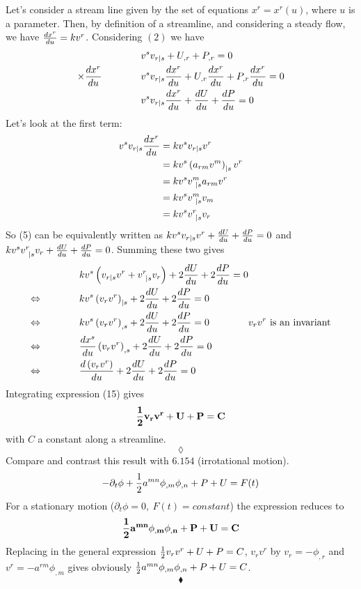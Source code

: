 Let's consider a stream line given by the set of equations $x^r = x^r(u)$, where $u$ is a parameter. Then, by definition of a streamline, and considering a steady flow, we have $\dv{x^r}{u} = kv^r$. Considering $(2)$ we have 
\begin{align}
&v^sv_{r|s} + U_{,r}+P_{,r}= 0\\
\times \dv{x^r}{u} \quad\quad\quad\quad &v^sv_{r|s}\dv{x^r}{u} + U_{,r}\dv{x^r}{u}+P_{,r}\dv{x^r}{u}= 0\\
\quad\quad\quad\quad &v^sv_{r|s}\dv{x^r}{u} + \dv{U}{u}+\dv{P}{u}= 0
\end{align}
Let's look at the first term:
\begin{align}
v^sv_{r|s}\dv{x^r}{u}&=kv^sv_{r|s}v^r\\
&=kv^s\left(a_{rm}v^m\right)_{|s}v^r\\
&=kv^sv^m_{\  |s}a_{rm}v^r\\
&=kv^sv^m_{\ |s}v_m\\
&=kv^sv^r_{\ |s}v_r
\end{align}
So (5) can be equivalently written as $kv^sv_{r|s}v^r + \dv{U}{u}+\dv{P}{u}= 0$ and $kv^sv^r_{\  |s}v_r+ \dv{U}{u}+\dv{P}{u}= 0$. Summing these two gives
\begin{align}
&kv^s\left(v_{r|s}v^r+ v^r_{\  |s}v_r\right) + 2\dv{U}{u}+2\dv{P}{u}= 0\\
\Leftrightarrow\quad\quad\quad\quad &kv^s\left(v_{r}v^r\right)_{|s} + 2\dv{U}{u}+2\dv{P}{u}= 0\\
\Leftrightarrow\quad\quad\quad\quad &kv^s\left(v_{r}v^r\right)_{,s} + 2\dv{U}{u}+2\dv{P}{u}= 0\quad\quad\quad\quad v_{r}v^r \text{ is an invariant}\\
\Leftrightarrow\quad\quad\quad\quad &\dv{x^s}{u}\left(v_{r}v^r\right)_{,s} + 2\dv{U}{u}+2\dv{P}{u}= 0\\
\Leftrightarrow\quad\quad\quad\quad &\dv{\left(v_{r}v^r\right)}{u} + 2\dv{U}{u}+2\dv{P}{u}= 0
\end{align}
Integrating expression (15) gives 
$$\mathbf{\frac{1}{2} v_{r}v^r + U+P= C}$$
with $C$ a constant along a streamline.
$$\lozenge$$
Compare and contrast this result with $\mathbf{6.154}$ (irrotational motion).
$$-\partial_t\phi + \frac{1}{2} a^{mn}\phi_{,m}\phi_{,n}+P+U=F(t)$$
For a stationary motion ($\partial_t\phi=0, \ F(t)=constant$) the expression reduces to 
$$\mathbf{\frac{1}{2} a^{mn}\phi_{,m}\phi_{,n}+P+U=C}$$
Replacing in the general expression $\frac{1}{2} v_{r}v^r + U+P= C$, $v_{r}v^r $ by $v_r = -\phi_{,r}$ and $v^r = -a^{rm}\phi_{,m}$ gives obviously $\frac{1}{2} a^{mn}\phi_{,m}\phi_{,n}+P+U=C$.
 $$\blacklozenge$$
\newpage



